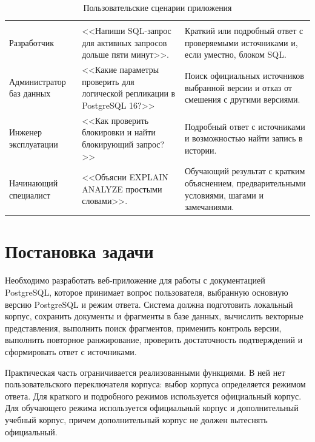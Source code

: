 \begingroup
\centering
\small
{}\selectfont
\setlength{\tabcolsep}{4pt}
\begin{longtable}{|P{0.23\textwidth}|P{0.34\textwidth}|P{0.35\textwidth}|}
\caption{Пользовательские сценарии приложения}\label{tab:analysis-user-scenarios}\\
\hline
{} &  &  \\ \hline
\endfirsthead
{}\\
\hline
\endhead
\endfoot
Разработчик & <<Напиши SQL-запрос для активных запросов дольше пяти минут>>. & Краткий или подробный ответ с проверяемыми источниками и, если уместно, блоком SQL. \\ \hline
Администратор баз данных & <<Какие параметры проверить для логической репликации в PostgreSQL 16?>> & Поиск официальных источников выбранной версии и отказ от смешения с другими версиями. \\ \hline
Инженер эксплуатации & <<Как проверить блокировки и найти блокирующий запрос?>> & Подробный ответ с источниками и возможностью найти запись в истории. \\ \hline
Начинающий специалист & <<Объясни EXPLAIN ANALYZE простыми словами>>. & Обучающий результат с кратким объяснением, предварительными условиями, шагами и замечаниями. \\ \hline
\end{longtable}
\par\endgroup

\section{Постановка задачи}

Необходимо разработать веб-приложение для работы с документацией PostgreSQL, которое принимает вопрос пользователя, выбранную основную версию PostgreSQL и режим ответа. Система должна подготовить локальный корпус, сохранить документы и фрагменты в базе данных, вычислить векторные представления, выполнить поиск фрагментов, применить контроль версии, выполнить повторное ранжирование, проверить достаточность подтверждений и сформировать ответ с источниками.

Практическая часть ограничивается реализованными функциями. В ней нет пользовательского переключателя корпуса: выбор корпуса определяется режимом ответа. Для краткого и подробного режимов используется официальный корпус. Для обучающего режима используется официальный корпус и дополнительный учебный корпус, причем дополнительный корпус не должен вытеснять официальный.

